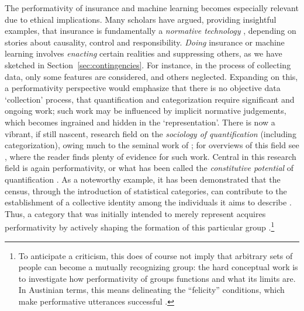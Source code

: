\documentclass[11pt]{article} %
\begin{document}
The performativity of insurance and machine learning becomes especially relevant due to ethical implications. Many scholars have argued, providing insightful examples, that insurance is fundamentally a \textit{normative technology}  \citep{baker2002embracing,glenn2003postmodernism,van2006making,van2007genetic,lehtonen2015producing,tanninen2020contested,prainsack2020shifting}, depending on stories about causality, control and responsibility. \textit{Doing} insurance or machine learning involves \textit{enacting} certain realities and suppressing others, as we have sketched in Section~\ref{sec:contingencies}. For instance, in the process of collecting data, only some features are considered, and others neglected. Expanding on this, a performativity perspective would emphasize that there is no objective data `collection' process, that quantification and categorization require significant and ongoing work; such work may be influenced by implicit normative judgements, which becomes ingrained and hidden in the `representation'. There is now a vibrant, if still nascent, research field on the \textit{sociology of quantification} (including categorization), owing much to the seminal work of \citet{desrosieres1998politics}; for overviews of this field see \citep{espeland2008sociology,diaz2016introduction,mennicken2019s}, where the reader finds plenty of evidence for such work. Central in this research field is again performativity, or what has been called the \textit{constitutive potential} of quantification  \citep{mennicken2019s}. 
As a noteworthy example, it has been demonstrated that the census, through the introduction of statistical categories, can contribute to the establishment of a collective identity among the individuals it aims to describe \citep{lee1993racial,mora2014making}. Thus, a category that was initially intended to merely represent acquires performativity by actively shaping the formation of this particular group \citep{gromme2020doing}.\footnote{To anticipate a criticism, this does of course not imply that arbitrary sets of people can become a mutually recognizing group: the hard conceptual work is to investigate how performativity of groups functions and what its limits are. 
In Austinian terms, this means delineating the ``felicity'' conditions, which make performative utterances successful \citep{brisset2016economics}.
} 
\end{document}
